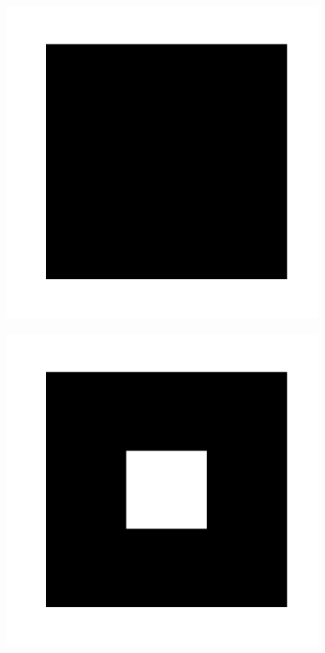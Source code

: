 \begin{figure}[h!]
     \centering
    \captionsetup[sub]{font=small}

     \begin{subfigure}[b!]{0.27 \textwidth}
         \caption{}
         \includegraphics[width=\textwidth]{Imagenes/Fractal/sierpinski_carpet_1.pdf}
     \end{subfigure}\hspace*{-0.9em}
     \begin{subfigure}[b!]{0.27 \textwidth}
         \caption{}
         \includegraphics[width=\textwidth]{Imagenes/Fractal/sierpinski_carpet_2.pdf}

\end{subfigure}
\end{figure}
